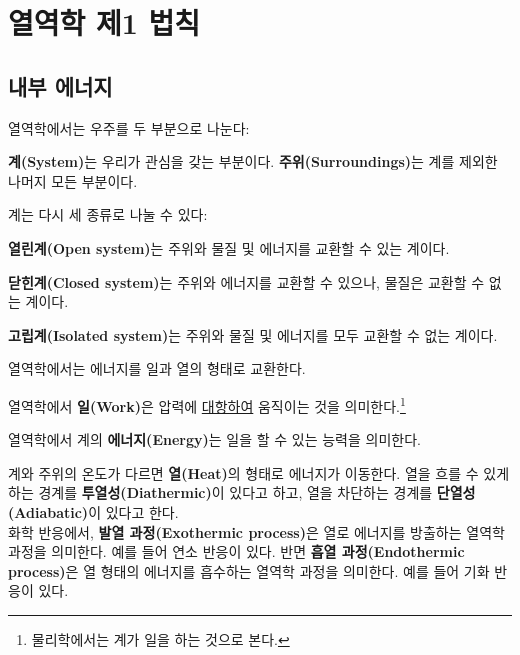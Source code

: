 \chapter{열역학 제1 법칙}
    \section{내부 에너지}\label{intener}
            \hspace{\parindent} 열역학에서는 우주를 두 부분으로 나눈다:
            \begin{defn}[계와 주위]
            \textbf{계(System)}는 우리가 관심을 갖는 부분이다. 
            \textbf{주위(Surroundings)}는 계를 제외한 나머지 모든 부분이다.
            \end{defn}
            계는 다시 세 종류로 나눌 수 있다:
            \begin{defn}[계의 종류]
            \begin{enum}
            \item \textbf{열린계(Open system)}는 주위와 물질 및 에너지를 교환할 수 있는 계이다. 
            \item \textbf{닫힌계(Closed system)}는 주위와 에너지를 교환할 수 있으나, 물질은 교환할 수 없는 계이다.
            \item \textbf{고립계(Isolated system)}는 주위와 물질 및 에너지를 모두 교환할 수 없는 계이다.
            \end{enum}
            \end{defn}
            \par 열역학에서는 에너지를 일과 열의 형태로 교환한다. 
            \begin{defn}[일]
            열역학에서 \textbf{일(Work)}은 압력에 \underline{대항하여} 움직이는 것을 의미한다.\footnote[1]{%
            물리학에서는 계가 일을 하는 것으로 본다.}
            \end{defn}
            \begin{defn}[에너지]
            열역학에서 계의 \textbf{에너지(Energy)}는 일을 할 수 있는 능력을 의미한다.
            \end{defn}
            계와 주위의 온도가 다르면 \textbf{열(Heat)}의 형태로 에너지가 이동한다. 열을 흐를 수 있게 하는 경계를 \textbf{투열성(Diathermic)}이 있다고 하고, 
            열을 차단하는 경계를 \textbf{단열성(Adiabatic)}이 있다고 한다.\\
            화학 반응에서, \textbf{발열 과정(Exothermic process)}은 열로 에너지를 방출하는 열역학 과정을 의미한다. 예를 들어 연소 반응이 있다. 
            반면 \textbf{흡열 과정(Endothermic process)}은 열 형태의 에너지를 흡수하는 열역학 과정을 의미한다. 예를 들어 기화 반응이 있다. 
